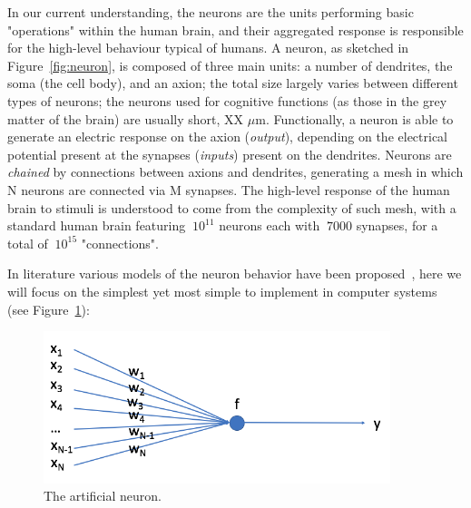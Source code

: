  In our current understanding, the neurons are the units performing basic "operations" within the human brain, and their aggregated response is responsible for the high-level behaviour typical of humans.
 A neuron, as sketched in Figure~\ref{fig:neuron}, is composed of three main units: a number of dendrites, the soma (the cell body), and an axion; the total size largely varies between different types of neurons; the neurons used for cognitive functions (as those in the grey matter of the brain) are usually short, XX $\mu$m.
Functionally, a neuron is able to generate an electric response on the axion (\emph{output}), depending on the electrical potential present at the synapses (\emph{inputs}) present on the dendrites. Neurons are \emph{chained} by connections between axions and dendrites, generating a mesh in which N neurons are connected via M synapses.
 The high-level response of the human brain to stimuli is understood to come from the complexity of such mesh, with a standard human brain featuring $~10^{11}$ neurons each with $~7000$ synapses, for a total of $~10^{15}$ "connections".

 In literature various models of the neuron behavior have been proposed~\cite{neuronbe1, neuronbe2, neuronbe3}, %
 here we will focus on the simplest yet most simple to implement in computer systems~\cite{artificialneuron} (see Figure~\ref{fig:artificialneuron}): %
 
 \begin{figure}[h]
    \centering
    \hfill
        \includegraphics[width=0.9\textwidth]{images/artificialneuron.png}
     \caption{The artificial neuron.}
     \label{fig:artificialneuron}

\end{figure}
 
